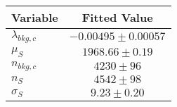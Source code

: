 \begin{tabular}[t]{lc}
\hline
Variable &Fitted Value\\
\hline\hline
$\lambda_{bkg,c}$&$-0.00495\pm0.00057$\\
\hline
$\mu_{S}$&$1968.66\pm0.19$\\
\hline
$n_{bkg,c}$&$4230\pm96$\\
\hline
$n_{S}$&$4542\pm98$\\
\hline
$\sigma_{S}$&$9.23\pm0.20$\\
\hline
\end{tabular}